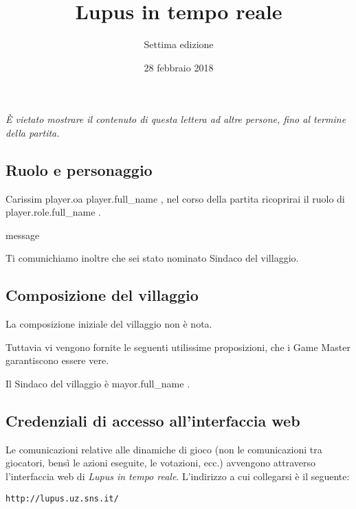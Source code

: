 \documentclass[a4paper,10pt]{article}
\title{Lupus in tempo reale}
\author{Settima edizione}
\date{28 febbraio 2018}
\begin{document}

\maketitle

\emph{È vietato mostrare il contenuto di questa lettera ad altre persone, fino al termine della partita.}


\subsection*{Ruolo e personaggio}
Carissim{{ player.oa }} {{ player.full_name }}, nel corso della partita ricoprirai il ruolo di {{ player.role.full_name }}.

{%

{%
    {%
        {{ message }}
    {%
{%

{%
    Ti comunichiamo inoltre che sei stato nominato Sindaco del villaggio.
{%


\subsection*{Composizione del villaggio}
La composizione iniziale del villaggio non è nota.
{%
Tuttavia vi vengono fornite le seguenti utilissime proposizioni, che i Game Master garantiscono essere vere.
\nopagebreak
{}
{%

Il Sindaco del villaggio è {{ mayor.full_name }}.


\subsection*{Credenziali di accesso all'interfaccia web}

Le comunicazioni relative alle dinamiche di gioco (non le comunicazioni tra giocatori, bensì le azioni eseguite, le votazioni, ecc.) avvengono attraverso l'interfaccia web di \emph{Lupus in tempo reale}.
L'indirizzo a cui collegarsi è il seguente:
\nopagebreak
\begin{center}
    \verb|http://lupus.uz.sns.it/|
\end{center}

}}}}}}}}}
\end{document}
